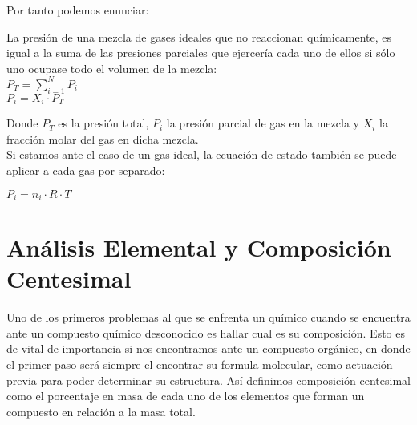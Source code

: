 Por tanto podemos enunciar:

\begin{law}
	La presión de una mezcla de gases ideales que no reaccionan químicamente, es igual a la suma de las presiones parciales que ejercería cada uno de ellos si sólo uno ocupase todo el volumen de la mezcla:\\
	
		$P_T = \displaystyle\sum_{i=1}^{N}P_i$\\
		
		$P_i = X_i \cdot P_T$
		
\end{law}

Donde $P_T$ es la presión total, $P_i$ la presión parcial de gas en la mezcla y $X_i$ la fracción molar del gas en dicha mezcla.\\

Si estamos ante el caso de un gas ideal, la ecuación de estado también se puede aplicar a cada gas por separado:

\begin{center}
	$P_i = n_i \cdot R \cdot T$
\end{center}

\section{Análisis Elemental y Composición Centesimal}

Uno de los primeros problemas al que se enfrenta un químico cuando se encuentra ante un compuesto químico desconocido es hallar cual es su composición. Esto es de vital de importancia si nos encontramos ante un compuesto orgánico, en donde el primer paso será siempre el encontrar su formula molecular, como actuación previa para poder determinar su estructura. Así definimos composición centesimal como el porcentaje en masa de cada uno de los elementos que forman un compuesto en relación a la masa total.

